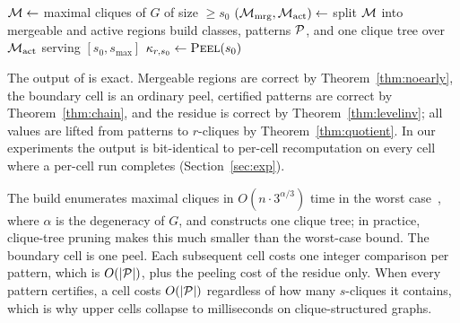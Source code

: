 \begin{algorithm}[t]
\caption{: one-build spectrum sweep.}
\label{alg:specnd}
$\mathcal{M}\gets$ maximal cliques of $G$ of size $\ge s_0$\;
$(\mathcal{M}_{\mathrm{mrg}},\mathcal{M}_{\mathrm{act}})\gets$ split $\mathcal{M}$ into mergeable and active regions\;
build classes, patterns $\mathcal{P}$, and one clique tree over $\mathcal{M}_{\mathrm{act}}$ serving $[s_0,s_{\max}]$\;
$\kappa_{r,s_0}\gets\textsc{Peel}(s_0)$ 
\;
\end{algorithm}

The output of \specnd{} is exact.
%
Mergeable regions are correct by Theorem~\ref{thm:noearly}, the boundary cell is an ordinary peel, certified patterns are correct by Theorem~\ref{thm:chain}, and the residue is correct by Theorem~\ref{thm:levelinv}; all values are lifted from patterns to $r$-cliques by Theorem~\ref{thm:quotient}.
%
In our experiments the output is bit-identical to per-cell recomputation on every cell where a per-cell run completes (Section~\ref{sec:exp}).

The build enumerates maximal cliques in $O(n\cdot 3^{\alpha/3})$ time in the worst case~\cite{Pivoter}, where $\alpha$ is the degeneracy of $G$, and constructs one clique tree; in practice, clique-tree pruning makes this much smaller than the worst-case bound.
%
The boundary cell is one peel.
%
Each subsequent cell costs one integer comparison per pattern, which is $O(|\mathcal{P}|)$, plus the peeling cost of the residue only.
%
When every pattern certifies, a cell costs $O(|\mathcal{P}|)$ regardless of how many $s$-cliques it contains, which is why upper cells collapse to milliseconds on clique-structured graphs.
